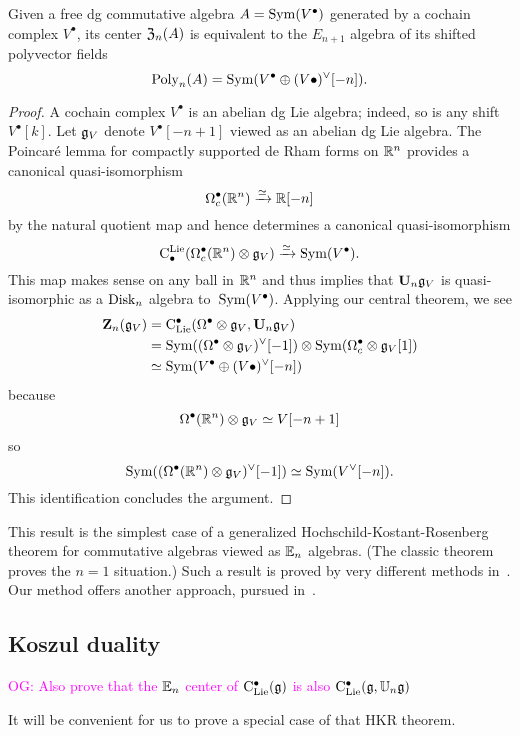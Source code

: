 \documentclass[11pt]{amsart}
\numberwithin{equation}{section}
\def\owen{\textcolor{magenta}{OG: }\textcolor{magenta}}
\begin{document}
\begin{prp}
Given a free dg commutative algebra $A = {\rm Sym}(V^\bullet)$ generated by a cochain complex $V^\bullet$,
its center ${\frak Z}_n(A)$ is equivalent to the $E_{n+1}$ algebra of its shifted polyvector fields 
\[
{\rm Poly}_n(A) = {\rm Sym}(V^\bullet \oplus (V\bullet)^\vee[-n]).
\]
\end{prp}

\begin{proof}
A cochain complex $V^\bullet$ is an abelian dg Lie algebra;
indeed, so is any shift $V^\bullet[k]$. 
Let $\mathfrak g_V$ denote $V^\bullet[-n+1]$ viewed as an abelian dg Lie algebra.
The Poincar\'e lemma for compactly supported de Rham forms on $\mathbb R^n$ provides a canonical quasi-isomorphism
\[
\Omega^\bullet_c(\mathbb R^n) \xrightarrow{\simeq} \mathbb R[-n]
\]
by the natural quotient map and hence determines a canonical quasi-isomorphism
\[
{\rm C}^{\rm Lie}_\bullet(\Omega^\bullet_c(\mathbb R^n) \otimes \mathfrak g_V) \xrightarrow{\simeq} {\rm Sym}(V^\bullet).
\]
This map makes sense on any ball in $\mathbb R^n$ and thus implies that $\mathbf U_n \mathfrak g_V$ is quasi-isomorphic as a ${\rm Disk}_n$ algebra to~${\rm Sym}(V^\bullet)$.
Applying our central theorem, we see
\begin{align*}
\mathbf Z_n(\mathfrak g_V) &= {\rm C}_{\rm Lie}^\bullet(\Omega^\bullet \otimes \mathfrak g_V, \mathbf U_n \mathfrak g_V) \\
&= {\rm Sym}((\Omega^\bullet \otimes \mathfrak g_V)^\vee[-1]) \otimes {\rm Sym}(\Omega^\bullet_c \otimes \mathfrak g_V[1])\\
& \simeq {\rm Sym}(V^\bullet \oplus (V\bullet)^\vee[-n])
\end{align*}
because
\[
\Omega^\bullet (\mathbb R^n) \otimes \mathfrak g_V \simeq V[-n+1]
\]
so
\[
{\rm Sym}( (\Omega^\bullet(\mathbb R^n) \otimes \mathfrak g_V)^\vee[-1]) \simeq {\rm Sym}( V^\vee[-n]).
\]
This identification concludes the argument.
\end{proof}

This result is the simplest case of a generalized Hochschild-Kostant-Rosenberg theorem for commutative algebras viewed as $\mathbb E_n$ algebras.
(The classic theorem proves the $n=1$ situation.)
Such a result is proved by very different methods in~\cite{CalWil, ToenBranes}.
Our method offers another approach, pursued in~\cite{GGWZ2}.

\subsection{Koszul duality}

\owen{Also prove that the $\mathbb E_n$ center of ${\rm C}_{\rm Lie}^\bullet(\mathfrak g)$ is also ${\rm C}_{\rm Lie}^\bullet(\mathfrak g, \mathbb U_n \mathfrak g)$}

It will be convenient for us to prove a special case of that HKR theorem.
\end{document}
